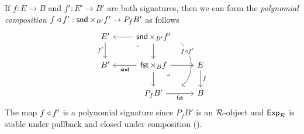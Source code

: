 \begin{definition}\label{def:pcomp}
  If $f : E \to B$ and $f' : E' \to B'$ are both signatures,
  then we can form the \emph{polynomial composition}
  $f \triangleleft f' : \mathop{\mathsf{snd}} \times_{B'} f' \to P_f B'$ as follows
  \[ \begin{tikzcd}
    {E'} & {\sndProj \times_{B'} f'} & \\
    {B'} & {\fstProj \times_B f} & E \\
    & {P_fB'} & B
    \arrow["{{f'}}"', from=1-1, to=2-1]
    \arrow[from=1-2, to=1-1]
    \arrow["\lrcorner"{anchor=center, pos=0.125, rotate=-90}, draw=none, from=1-2, to=2-1]
    \arrow[from=1-2, to=2-2]
    \arrow["{f \pcomp f'}"{description, pos=0.2}, shift left=10, bend left = 50, from=1-2, to=3-2]
    \arrow["{{\sndProj}}", from=2-2, to=2-1]
    \arrow[from=2-2, to=2-3]
    \arrow[from=2-2, to=3-2]
    \arrow["\lrcorner"{anchor=center, pos=0.125}, draw=none, from=2-2, to=3-3]
    \arrow["f", from=2-3, to=3-3]
    \arrow["{{\fstProj}}"', from=3-2, to=3-3]
  \end{tikzcd}\]
  The map $f \triangleleft f'$ is a polynomial signature
  since $P_f B'$ is an $\mathcal{R}$-object
  and $\mathsf{Exp}_{\mathcal{R}}$ is stable under pullback and closed under composition
  ().
\end{definition}

